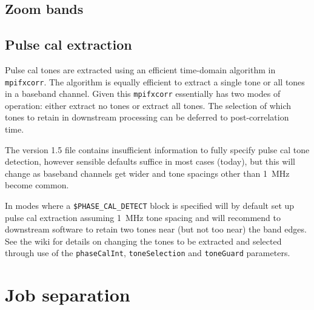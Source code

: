 \documentclass[12pt]{article}
\begin{document}
\begin{itemize}
\end{itemize}



\subsection{Zoom bands}



\subsection{Pulse cal extraction}

Pulse cal tones are extracted using an efficient time-domain algorithm in {\tt mpifxcorr}.
The algorithm is equally efficient to extract a single tone or all tones in a baseband channel.
Given this {\tt mpifxcorr} essentially has two modes of operation: either extract no tones or extract all tones.
The selection of which tones to retain in downstream processing can be deferred to post-correlation time.

The version 1.5 \vx file contains insufficient information to fully specify pulse cal tone detection, however sensible defaults suffice in most cases (today), but this will change as baseband channels get wider and tone spacings other than 1~MHz become common. 

In modes where a {\tt \$PHASE\_CAL\_DETECT} block is specified \vexdifx will by default set up pulse cal extraction assuming 1~MHz tone spacing and will recommend to downstream software to retain two tones near (but not too near) the band edges.
See the \vexdifx wiki for details on changing the tones to be extracted and selected through use of the {\tt phaseCalInt}, {\tt toneSelection} and {\tt toneGuard} parameters.



\section{Job separation} \label{sec:break}
\end{document}
